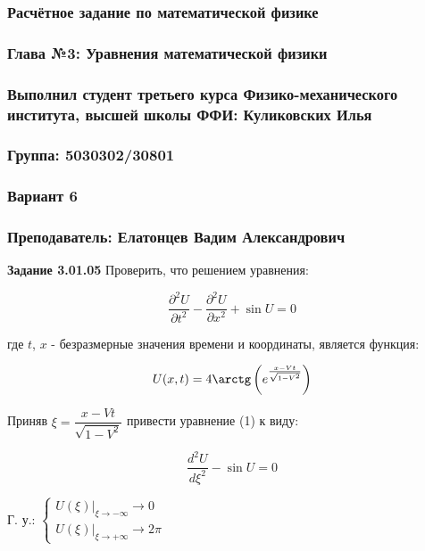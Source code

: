 \documentclass[a4paper, 12pt]{article}
\begin{document}
	\begin{center}
		\subsubsection*{Расчётное задание по математической физике}
		\subsubsection*{Глава №3: Уравнения математической физики}
		\subsubsection*{Выполнил студент третьего курса Физико-механического института, высшей школы ФФИ: Куликовских Илья}
		\subsubsection*{Группа: 5030302/30801}
		\subsubsection*{Вариант 6}
		\subsubsection*{Преподаватель: Елатонцев Вадим Александрович}
	\end{center}
	
	\quad \textbf{Задание 3.01.05} Проверить, что решением уравнения: 
	
	\begin{equation}
		\dfrac{\partial^2 U}{\partial t^2} - \dfrac{\partial^2 U}{\partial x^2} + \sin U = 0 
	\end{equation}
	
	\quad где $t$, $x$ - безразмерные значения времени и координаты, является функция: 
	
	\begin{equation}
		U(x, t) = 4\arctg\left( e^{\frac{x-Vt}{\sqrt{1 - V^2}}} \right)
	\end{equation}
	
	\quad Приняв $\xi = \dfrac{x - Vt}{\sqrt{1 - V^2}}$ привести уравнение (1) к виду:
	
	\begin{equation}
		\dfrac{d^2 U}{d\xi^2} - \sin U = 0
	\end{equation}
	
	\begin{center} 
		Г. у.: $\begin{cases}
			U (\xi)\bigg|_{\xi \rightarrow -\infty} \rightarrow 0 \\
			
			U(\xi)\bigg|_{\xi \rightarrow +\infty } \rightarrow 2\pi 
		\end{cases}$
	\end{center}
	
\end{document}
